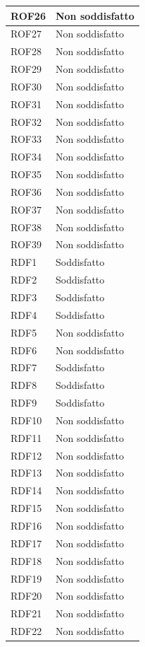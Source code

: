 \begin{longtable}{| p{2.5cm} | p{3cm} |}
	ROF26 & Non soddisfatto \\ \hline
	ROF27 & Non soddisfatto \\ \hline
	ROF28 & Non soddisfatto \\ \hline
	ROF29 & Non soddisfatto \\ \hline
	ROF30 & Non soddisfatto \\ \hline
	ROF31 & Non soddisfatto \\ \hline
	ROF32 & Non soddisfatto \\ \hline
	ROF33 & Non soddisfatto \\ \hline
	ROF34 & Non soddisfatto \\ \hline
	ROF35 & Non soddisfatto \\ \hline
	ROF36 & Non soddisfatto \\ \hline
	ROF37 & Non soddisfatto \\ \hline
	ROF38 & Non soddisfatto \\ \hline
	ROF39 & Non soddisfatto \\ \hline
	RDF1 & Soddisfatto \\ \hline
	RDF2 & Soddisfatto \\ \hline
	RDF3 & Soddisfatto \\ \hline
	RDF4 & Soddisfatto \\ \hline
	RDF5 & Non soddisfatto \\ \hline
	RDF6 & Non soddisfatto \\ \hline
	RDF7 & Soddisfatto \\ \hline
	RDF8 & Soddisfatto \\ \hline
	RDF9 & Soddisfatto \\ \hline
	RDF10 & Non soddisfatto \\ \hline
	RDF11 & Non soddisfatto \\ \hline
	RDF12 & Non soddisfatto \\ \hline
	RDF13 & Non soddisfatto \\ \hline
	RDF14 & Non soddisfatto \\ \hline
	RDF15 & Non soddisfatto \\ \hline
	RDF16 & Non soddisfatto \\ \hline
	RDF17 & Non soddisfatto \\ \hline
	RDF18 & Non soddisfatto \\ \hline
	RDF19 & Non soddisfatto \\ \hline
	RDF20 & Non soddisfatto \\ \hline
	RDF21 & Non soddisfatto \\ \hline
	RDF22 & Non soddisfatto \\ \hline

\end{longtable}
